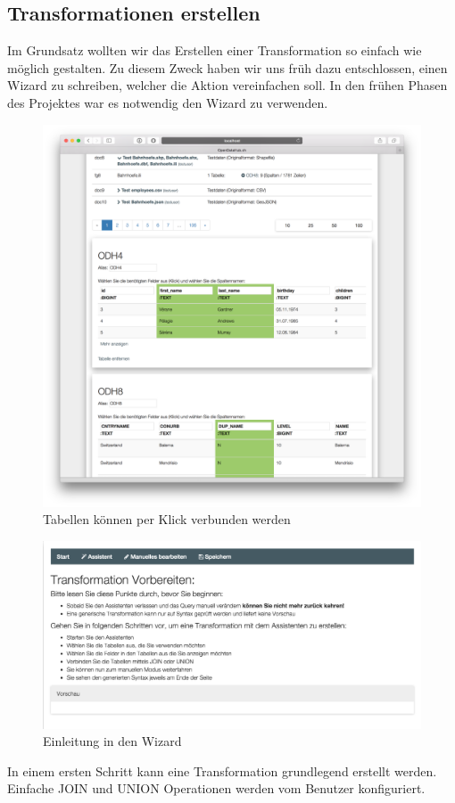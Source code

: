 \subsection{Transformationen erstellen}
Im Grundsatz wollten wir das Erstellen einer Transformation so einfach wie möglich gestalten. Zu diesem Zweck haben wir uns früh dazu entschlossen, einen Wizard zu schreiben, welcher die Aktion vereinfachen soll. In den frühen Phasen des Projektes war es notwendig den Wizard zu verwenden.
 \xxx[ref]
\begin{figure}[H]
\centering
\includegraphics[width=\linewidth]{fig/odhql_wizard_early.png}
\caption{Tabellen können per Klick verbunden werden }
\label{fig:pd:caches}
\end{figure}


 \xxx[ref]
\begin{figure}[H]
\centering
\includegraphics[width=\linewidth]{fig/wizard-step-one.png}
\caption{Einleitung in den Wizard}
\label{fig:pd:caches}
\end{figure}
In einem ersten Schritt kann eine Transformation grundlegend erstellt werden. Einfache JOIN und UNION Operationen werden vom Benutzer konfiguriert.

